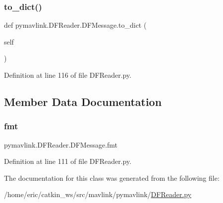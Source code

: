 \subsubsection{\texorpdfstring{to\_dict()}{to\_dict()}}
{\footnotesize\ttfamily def pymavlink.\+D\+F\+Reader.\+D\+F\+Message.\+to\+\_\+dict (\begin{DoxyParamCaption}\item[{}]{self }\end{DoxyParamCaption})}



Definition at line 116 of file D\+F\+Reader.\+py.



\subsection{Member Data Documentation}
\mbox{\label{classpymavlink_1_1DFReader_1_1DFMessage_a8f37e80929b490f8f9914e5c01fc7800}} 
\subsubsection{\texorpdfstring{fmt}{fmt}}
{\footnotesize\ttfamily pymavlink.\+D\+F\+Reader.\+D\+F\+Message.\+fmt}



Definition at line 111 of file D\+F\+Reader.\+py.



The documentation for this class was generated from the following file\+:\begin{DoxyCompactItemize}
\item 
/home/eric/catkin\+\_\+ws/src/mavlink/pymavlink/\mbox{\hyperlink{DFReader_8py}{D\+F\+Reader.\+py}}\end{DoxyCompactItemize}
